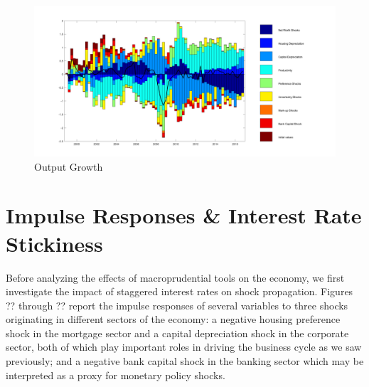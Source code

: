 \documentclass[12pt]{article}
\numberwithin{equation}{section}
\begin{document}







\begin{figure}[H]
\centering
\caption{Output Growth}
\includegraphics[scale=0.45]{decomp_dy.pdf}
\end{figure}




\section*{Impulse Responses \& Interest Rate Stickiness}

Before analyzing the effects of macroprudential tools on the economy, we first investigate the impact of staggered interest rates on shock propagation. Figures ?? through ?? report the impulse responses of several variables to three shocks originating in different sectors of the economy: a negative housing preference shock in the mortgage sector and a capital depreciation shock in the corporate sector, both of which play important roles in driving the business cycle as we saw previously; and a negative bank capital shock in the banking sector which may be interpreted as a proxy for monetary policy shocks. 
\end{document}
